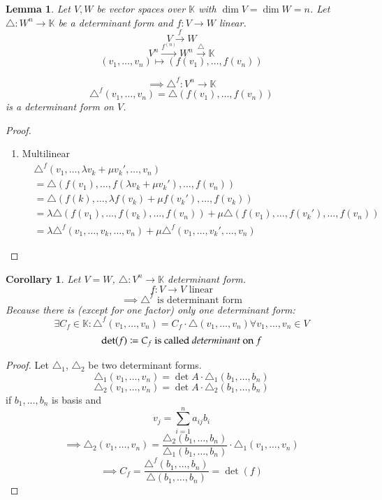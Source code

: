\documentclass{article}
\newtheorem{lemma}{Lemma}  \numberwithin{lemma}{section}
\newtheorem*{corollary}{Corollary}%
\begin{document}
\begin{lemma} %
  Let $V, W$ be vector spaces over $\mathbb K$ with $\dim{V} = \dim{W} = n$.
  Let $\triangle: W^n \to \mathbb K$ be a determinant form and $f: V \to W$ linear.
  \[ V \xrightarrow{f} W \]
  \[ V^n \xrightarrow{f^{(n)}} W^n \xrightarrow{\triangle} \mathbb K \]
  \[ (v_1, \dots, v_n) \mapsto (f(v_1), \dots, f(v_n)) \]

  \[ \implies \triangle^f: V^n \to \mathbb K \]
  \[ \triangle^f(v_1, \dots, v_n) = \triangle(f(v_1), \dots, f(v_n)) \]
  is a determinant form on $V$.
\end{lemma}

\begin{proof}
  \begin{enumerate}
    \item Multilinear
      \begin{align*}
        &\triangle^f (v_1, \dots, \lambda v_k + \mu v_k', \dots, v_n) \\
        &= \triangle (f(v_1), \dots, f(\lambda v_k + \mu v_k'), \dots, f(v_n)) \\
        &= \triangle(f(k), \dots, \lambda f(v_k) + \mu f(v_k'), \dots, f(v_k)) \\
        &= \lambda \triangle (f(v_1), \dots, f(v_k), \dots, f(v_n)) + \mu \triangle(f(v_1), \dots, f(v_k'), \dots, f(v_n)) \\
        &= \lambda \triangle^f(v_1, \dots, v_k, \dots, v_n) + \mu \triangle^f (v_1, \dots, v_k', \dots, v_n)
      \end{align*}
  \end{enumerate}
\end{proof}

\begin{corollary} %
  \label{cor726}
  Let $V = W$, $\triangle: V^n \to \mathbb K$ determinant form.
  \[ f: V \to V \text{ linear} \]
  \[ \implies \triangle^f \text{ is determinant form} \]
  Because there is (except for one factor) only one determinant form:
  \[ \exists C_f \in \mathbb K: \triangle^f(v_1, \dots, v_n) = C_f \cdot \triangle(v_1, \dots, v_n) \forall v_1,\dots,v_n \in V \]
  \[ \det(f) \coloneqq C_f \text{ is called \emph{determinant} on } f \]
\end{corollary}

\begin{proof}
  Let $\triangle_1$, $\triangle_2$ be two determinant forms.
  \[ \triangle_1 (v_1, \dots, v_n) = \det{A} \cdot \triangle_1(b_1, \dots, b_n) \]
  \[ \triangle_2 (v_1, \dots, v_n) = \det{A} \cdot \triangle_2(b_1, \dots, b_n) \]
  if $b_1, \dots, b_n$ is basis and
  \[ v_j = \sum_{i=1}^n a_{ij} b_i \]
  \[ \implies \triangle_2(v_1, \dots, v_n) = \frac{\triangle_2(b_1, \dots, b_n)}{\triangle_1(b_1, \dots, b_n)} \cdot \triangle_1(v_1, \dots, v_n) \]
  \[ \implies C_f = \frac{\triangle^f(b_1, \dots, b_n)}{\triangle (b_1, \dots, b_n)} = \det(f) \]
\end{proof}
\end{document}
